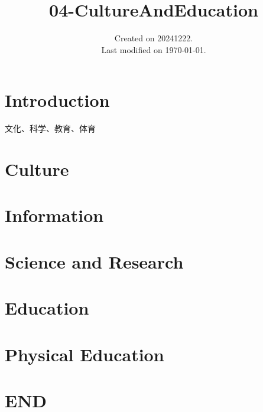 \documentclass[UTF8]{../ApplicationUniverse}
\begin{document}
\title{04-CultureAndEducation}
\date{Created on 20241222.\\   Last modified on \today.}
\maketitle
\tableofcontents


\chapter{Introduction}


文化、科学、教育、体育



\chapter{Culture}%


\chapter{Information}%


\chapter{Science and Research}%


\chapter{Education}%


\chapter{Physical Education}%



\chapter{END}
\end{document}
